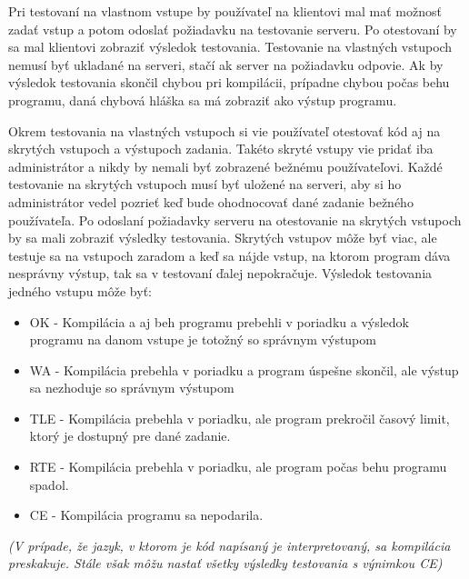 Pri testovaní na vlastnom vstupe by používateľ na klientovi mal mať možnosť zadať vstup a potom
odoslať požiadavku na testovanie serveru. Po otestovaní by sa mal klientovi zobraziť výsledok
testovania. Testovanie na vlastných vstupoch nemusí byť ukladané na serveri, stačí ak server na
požiadavku odpovie. Ak by výsledok testovania skončil chybou pri kompilácii, prípadne chybou počas
behu programu, daná chybová hláška sa má zobraziť ako výstup programu.

Okrem testovania na vlastných vstupoch si vie používateľ otestovať kód aj na skrytých vstupoch a
výstupoch zadania. Takéto skryté vstupy vie pridať iba administrátor a nikdy by nemali byť zobrazené
bežnému používateľovi. Každé testovanie na skrytých vstupoch musí byť uložené na serveri, aby si ho
administrátor vedel pozrieť keď bude ohodnocovať dané zadanie bežného používateľa. Po odoslaní
požiadavky serveru na otestovanie na skrytých vstupoch by sa mali zobraziť výsledky testovania.
Skrytých vstupov môže byť viac, ale testuje sa na vstupoch zaradom a keď sa nájde vstup, na ktorom
program dáva nesprávny výstup, tak sa v testovaní ďalej nepokračuje.
Výsledok testovania jedného vstupu môže byť:
\begin{itemize}
\item OK - Kompilácia a aj beh programu prebehli v poriadku a výsledok programu na danom vstupe
je totožný so správnym výstupom
\item WA - Kompilácia prebehla v poriadku a program úspešne skončil, ale výstup sa nezhoduje so
správnym výstupom
\item TLE - Kompilácia prebehla v poriadku, ale program prekročil časový limit, ktorý je dostupný 
pre dané zadanie.
\item RTE - Kompilácia prebehla v poriadku, ale program počas behu programu spadol.
\item CE - Kompilácia programu sa nepodarila.
\end{itemize}
\textit{(V prípade, že jazyk, v ktorom je kód napísaný je interpretovaný, sa kompilácia preskakuje.
Stále však môžu nastať všetky výsledky testovania s výnimkou CE)}
